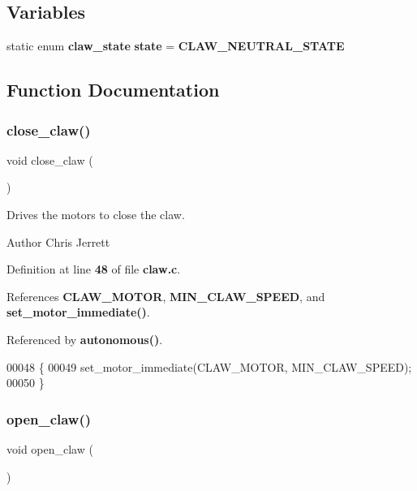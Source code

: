 \subsection*{Variables}
\begin{DoxyCompactItemize}
\item 
static enum \textbf{ claw\+\_\+state} \textbf{ state} = \textbf{ C\+L\+A\+W\+\_\+\+N\+E\+U\+T\+R\+A\+L\+\_\+\+S\+T\+A\+TE}
\end{DoxyCompactItemize}


\subsection{Function Documentation}
\mbox{\label{claw_8c_ac42dd40dbb37219295286859c6b068c2}} 
\subsubsection{close\+\_\+claw()}
{\footnotesize\ttfamily void close\+\_\+claw (\begin{DoxyParamCaption}{ }\end{DoxyParamCaption})}



Drives the motors to close the claw. 

\begin{DoxyAuthor}{Author}
Chris Jerrett 
\end{DoxyAuthor}


Definition at line \textbf{ 48} of file \textbf{ claw.\+c}.



References \textbf{ C\+L\+A\+W\+\_\+\+M\+O\+T\+OR}, \textbf{ M\+I\+N\+\_\+\+C\+L\+A\+W\+\_\+\+S\+P\+E\+ED}, and \textbf{ set\+\_\+motor\+\_\+immediate()}.



Referenced by \textbf{ autonomous()}.


\begin{DoxyCode}
00048                   \{
00049   set_motor_immediate(CLAW_MOTOR, MIN_CLAW_SPEED);
00050 \}
\end{DoxyCode}
\mbox{\label{claw_8c_a03023ca28f671b9fa7bac07782ccd8c1}} 
\subsubsection{open\+\_\+claw()}
{\footnotesize\ttfamily void open\+\_\+claw (\begin{DoxyParamCaption}{ }\end{DoxyParamCaption})}




